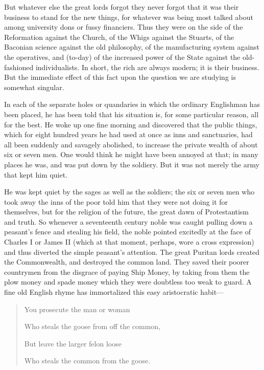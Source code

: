 \documentclass{book}
\begin{document}
But whatever else the great lords forgot they never forgot that it was their business to stand for the new things, for whatever was being most talked about among university dons or fussy financiers. Thus they were on the side of the Reformation against the Church, of the Whigs against the Stuarts, of the Baconian science against the old philosophy, of the manufacturing system against the operatives, and (to-day) of the increased power of the State against the old-fashioned individualists. In short, the rich are always modern; it is their business. But the immediate effect of this fact upon the question we are studying is somewhat singular.

In each of the separate holes or quandaries in which the ordinary Englishman has been placed, he has been told that his situation is, for some particular reason, all for the best. He woke up one fine morning and discovered that the public things, which for eight hundred years he had used at once as inns and sanctuaries, had all been suddenly and savagely abolished, to increase the private wealth of about six or seven men. One would think he might have been annoyed at that; in many places he was, and was put down by the soldiery. But it was not merely the army that kept him quiet.

He was kept quiet by the sages as well as the soldiers; the six or seven men who took away the inns of the poor told him that they were not doing it for themselves, but for the religion of the future, the great dawn of Protestantism and truth. So whenever a seventeenth century noble was caught pulling down a peasant’s fence and stealing his field, the noble pointed excitedly at the face of Charles I or James II (which at that moment, perhaps, wore a cross expression) and thus diverted the simple peasant’s attention. The great Puritan lords created the Commonwealth, and destroyed the common land. They saved their poorer countrymen from the disgrace of paying Ship Money, by taking from them the plow money and spade money which they were doubtless too weak to guard. A fine old English rhyme has immortalized this easy aristocratic habit—

\begin{quotation}
	You prosecute the man or woman

	Who steals the goose from off the common,

	But leave the larger felon loose

	Who steals the common from the goose.
\end{quotation}
\end{document}
